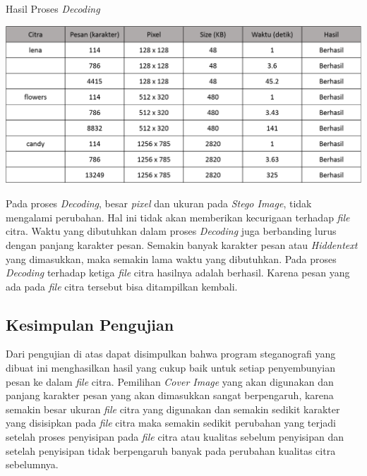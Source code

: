 	\begin{table}[H]
		\centering
		\caption{Hasil Proses \emph{Decoding}}
		\includegraphics[width=1.0\textwidth]{gambar/table_hasildecode2}
		\label{tabel_hasildecode2}
	\end{table}
	
	Pada proses \emph{Decoding}, besar \emph{pixel} dan ukuran pada \emph{Stego Image}, tidak mengalami perubahan. Hal ini tidak akan memberikan kecurigaan terhadap \emph{file} citra. Waktu yang dibutuhkan dalam proses \emph{Decoding} juga berbanding lurus dengan panjang karakter pesan. Semakin banyak karakter pesan atau \emph{Hiddentext} yang dimasukkan, maka semakin lama waktu yang dibutuhkan. Pada proses \emph{Decoding} terhadap ketiga \emph{file} citra hasilnya adalah berhasil. Karena pesan yang ada pada \emph{file} citra tersebut bisa ditampilkan kembali.
	
	\subsection{Kesimpulan Pengujian}
	Dari pengujian di atas dapat disimpulkan bahwa program steganografi yang dibuat ini menghasilkan hasil yang cukup baik untuk setiap penyembunyian pesan ke dalam \emph{file} citra. Pemilihan \emph{Cover Image} yang akan digunakan dan panjang karakter pesan yang akan dimasukkan sangat berpengaruh, karena semakin besar ukuran \emph{file} citra yang digunakan dan semakin sedikit karakter yang disisipkan pada \emph{file} citra maka semakin sedikit perubahan yang terjadi setelah proses penyisipan pada \emph{file} citra atau kualitas sebelum penyisipan dan setelah penyisipan tidak berpengaruh banyak pada perubahan kualitas citra sebelumnya.
	